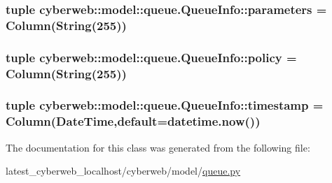 \hypertarget{classcyberweb_1_1model_1_1queue_1_1_queue_info_ab93f7708be8c0fa1f0572d55b72fdba5}{
\subsubsection[{parameters}]{\setlength{\rightskip}{0pt plus 5cm}tuple {\bf cyberweb\-::model\-::queue.\-Queue\-Info\-::parameters} = \-Column(\-String(255))}}\label{classcyberweb_1_1model_1_1queue_1_1_queue_info_ab93f7708be8c0fa1f0572d55b72fdba5}
\hypertarget{classcyberweb_1_1model_1_1queue_1_1_queue_info_a26f38de1bf1e31ee5a691bde93c5daaf}{
\subsubsection[{policy}]{\setlength{\rightskip}{0pt plus 5cm}tuple {\bf cyberweb\-::model\-::queue.\-Queue\-Info\-::policy} = \-Column(\-String(255))}}\label{classcyberweb_1_1model_1_1queue_1_1_queue_info_a26f38de1bf1e31ee5a691bde93c5daaf}
\hypertarget{classcyberweb_1_1model_1_1queue_1_1_queue_info_aa76dd6d961300cf2f4cf04523a05e17b}{
\subsubsection[{timestamp}]{\setlength{\rightskip}{0pt plus 5cm}tuple {\bf cyberweb\-::model\-::queue.\-Queue\-Info\-::timestamp} = \-Column(\-Date\-Time,default=datetime.\-now())}}\label{classcyberweb_1_1model_1_1queue_1_1_queue_info_aa76dd6d961300cf2f4cf04523a05e17b}


\-The documentation for this class was generated from the following file\-:\begin{DoxyCompactItemize}
\item 
latest\-\_\-cyberweb\-\_\-localhost/cyberweb/model/\hyperlink{queue_8py}{queue.\-py}\end{DoxyCompactItemize}
